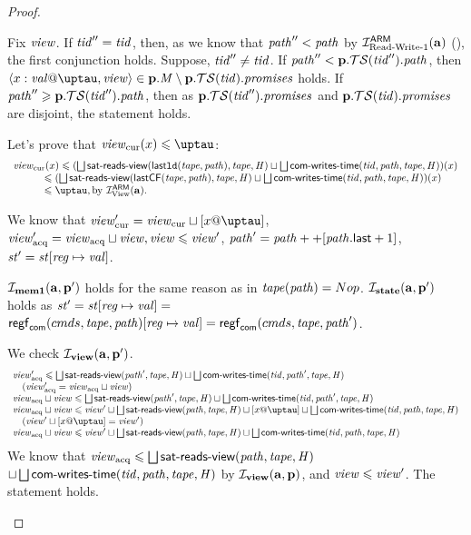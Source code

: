 \begin{proof}
\begin{itemize}
   Fix $\mathit{view}$. If $\mathit{tid}'' = \mathit{tid}$, then, as we know that $\mathit{path}'' < \mathit{path}$ by $\mathcal{I}^\mathsf{ARM}_{\textup{\rm {Read-Write-1}}}(\mathbf{a})$ (\app{\ref{inv:invAReadWriteOne}}),
   the first conjunction holds.
   Suppose, $\mathit{tid}'' \not = \mathit{tid}$.
   If $\mathit{path}'' < \mathbf{p}.\mathcal{TS}(\mathit{tid}'').\mathit{path}$, then
      $\writeEvt{x}{\stval}{\tau}{\R} \in \p.\Mprom \setminus \p.\TSfprom(\tId).\PromSet$ holds.
   If $\mathit{path}'' \geqslant \mathbf{p}.\mathcal{TS}(\mathit{tid}'').\mathit{path}$, then
      as $\mathbf{p}.\mathcal{TS}(\mathit{tid}'').\mathit{promises}$ and $\mathbf{p}.\mathcal{TS}(\mathit{tid}).\mathit{promises}$ are disjoint, the statement holds.

  Let's prove that $\Rcur(x) \le \tau$:
  \[\begin{array}{l}
    \Rcur(x) \le (\bigsqcup \readsSatisfiedR(\lastLD(\tape, \cpath), \tape, \hmap)
                  \sqcup \bigsqcup \opstau(\tId, \cpath, \tape, \hmap))(x) \\
    \quad \quad \quad
        \le (\bigsqcup \readsSatisfiedR(\lastCF(\tape, \cpath), \tape, \hmap)
                  \sqcup \bigsqcup \opstau(\tId, \cpath, \tape, \hmap))(x) \\
    \quad \quad \quad
     \le \tau, \text{by } \invAview(\aT).
  \end{array}\]
  
  We know that $\Rcur' = \Rcur \sqcup [x@\tau]$, $\mathit{view}_{\mathrm{acq}}' = \mathit{view}_{\mathrm{acq}} \sqcup \mathit{view}, \mathit{view} \leqslant \mathit{view}'$,
  $\cpath' = \cpath ++ [\lastInstr{\cpath} + 1]$, $\mathit{st}' = \mathit{st}[\mathit{reg} \mapsto \mathit{val}]$.

  $\mathcal{I}_{\rm \bf mem1}(\mathbf{a}, \mathbf{p}')$ holds for the same reason as in $\mathit{tape}(\mathit{path}) = Nop$.
  $\mathcal{I}_{\rm \bf state}(\mathbf{a}, \mathbf{p}')$ holds as
  $\mathit{st}' = \mathit{st}[\mathit{reg} \mapsto \mathit{val}] =$
  $\mathsf{regf}_\mathsf{com}({cmds}, \mathit{tape}, \mathit{path})[\mathit{reg} \mapsto \mathit{val}] = \mathsf{regf}_\mathsf{com}({cmds}, \mathit{tape}, \mathit{path}')$.
  
  We check $\mathcal{I}_{\rm \bf view} (\mathbf{a}, \mathbf{p}')$.
  \[\begin{array}{l}
    \Racq' \le \bigsqcup \readsSatisfiedR(\cpath', \tape, \hmap) \sqcup \bigsqcup \opstau(\tId, \cpath', \tape, \hmap) \\
    \quad (\Racq' = \Racq \sqcup \R) \\
    \Racq \sqcup \R \le \bigsqcup \readsSatisfiedR(\cpath', \tape, \hmap) \sqcup \bigsqcup \opstau(\tId, \cpath', \tape, \hmap) \\
    \Racq \sqcup \R \le \R' \sqcup \bigsqcup \readsSatisfiedR(\cpath, \tape, \hmap) \sqcup
          [x@\tau] \sqcup \bigsqcup \opstau(\tId, \cpath, \tape, \hmap) \\
    \quad (\R' \sqcup [x@\tau] = \R') \\
    \Racq \sqcup \R \le \R' \sqcup \bigsqcup \readsSatisfiedR(\cpath, \tape, \hmap)
          \sqcup \bigsqcup \opstau(\tId, \cpath, \tape, \hmap) \\
  \end{array}\]
  We know that $\mathit{view}_{\mathrm{acq}} \leqslant \bigsqcup \textsf{sat-reads-view}(\mathit{path}, \mathit{tape}, \mathit{H})$ $\sqcup \bigsqcup \textsf{com-writes-time}(\mathit{tid}, \mathit{path}, \mathit{tape}, \mathit{H})$
  by $\mathcal{I}_{\rm \bf view}(\mathbf{a}, \mathbf{p})$, and $\mathit{view} \leqslant \mathit{view}'$. The statement holds.


\end{itemize}
\end{proof}
